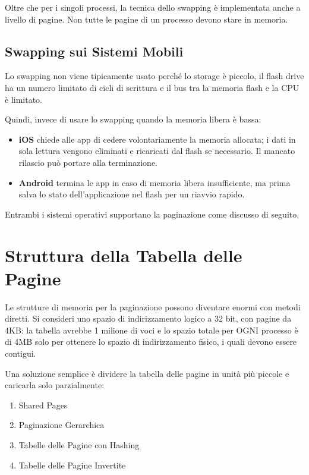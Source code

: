 Oltre che per i singoli processi, la tecnica dello swapping è implementata anche a livello di
pagine. Non tutte le pagine di un processo devono stare in memoria.


\subsection{Swapping sui Sistemi Mobili}


Lo swapping non viene tipicamente usato perché lo storage è piccolo, il flash drive ha un numero limitato di cicli di scrittura e il bus tra la memoria flash e la CPU è limitato.

Quindi, invece di usare lo swapping quando la memoria libera è bassa:

\begin{itemize}
  \item \textbf{iOS} chiede alle app di cedere volontariamente la memoria allocata; i dati in sola lettura vengono eliminati e ricaricati dal flash se necessario. Il mancato rilascio può portare alla terminazione.
  \item \textbf{Android} termina le app in caso di memoria libera insufficiente, ma prima salva lo stato dell'applicazione nel flash per un riavvio rapido.
\end{itemize}


Entrambi i sistemi operativi supportano la paginazione come discusso di seguito.



\section{Struttura della Tabella delle Pagine}

Le strutture di memoria per la paginazione possono diventare enormi con metodi diretti. Si consideri uno spazio di indirizzamento logico a 32 bit, con pagine da 4KB: la tabella avrebbe 1 milione di voci e lo spazio totale per OGNI processo è di 4MB solo per ottenere lo spazio di indirizzamento fisico, i quali devono essere contigui.

Una soluzione semplice è dividere la tabella delle pagine in unità più piccole e caricarla solo parzialmente:

\begin{enumerate}
  \item Shared Pages
  \item Paginazione Gerarchica
  \item Tabelle delle Pagine con Hashing
  \item Tabelle delle Pagine Invertite
\end{enumerate}

